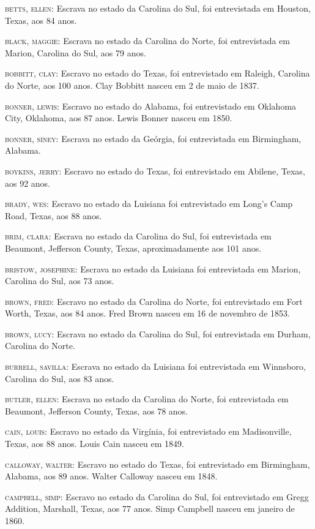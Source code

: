\begin{Parskip}
\textsc{betts, ellen:} Escrava no estado da Carolina do Sul, foi
entrevistada em Houston, Texas, aos 84 anos.

\textsc{black, maggie:} Escrava no estado da Carolina do Norte, foi
entrevistada em Marion, Carolina do Sul, aos 79 anos.

\textsc{bobbitt, clay:} Escravo no estado do Texas, foi entrevistado em
Raleigh, Carolina do Norte, aos 100 anos. Clay Bobbitt nasceu em 2 de
maio de 1837.

\textsc{bonner, lewis:} Escravo no estado do Alabama, foi entrevistado
em Oklahoma City, Oklahoma, aos 87 anos. Lewis Bonner nasceu em 1850.

\textsc{bonner, siney:} Escrava no estado da Geórgia, foi entrevistada
em Birmingham, Alabama.

\textsc{boykins, jerry:} Escravo no estado do Texas, foi entrevistado em
Abilene, Texas, aos 92 anos.

\textsc{brady, wes:} Escravo no estado da Luisiana foi entrevistado em
Long's Camp Road, Texas, aos 88 anos.

\textsc{brim, clara:} Escrava no estado da Carolina do Sul, foi
entrevistada em Beaumont, Jefferson County, Texas, aproximadamente aos
101 anos.

\textsc{bristow, josephine:} Escrava no estado da Luisiana foi
entrevistada em Marion, Carolina do Sul, aos 73 anos.

\textsc{brown, fred:} Escravo no estado da Carolina do Norte, foi
entrevistado em Fort Worth, Texas, aos 84 anos. Fred Brown nasceu em 16
de novembro de 1853.

\textsc{brown, lucy:} Escrava no estado da Carolina do Sul, foi
entrevistada em Durham, Carolina do Norte.

\textsc{burrell, savilla:} Escrava no estado da Luisiana foi
entrevistada em Winnsboro, Carolina do Sul, aos 83 anos.

\textsc{butler, ellen:} Escrava no estado da Carolina do Norte, foi
entrevistada em Beaumont, Jefferson County, Texas, aos 78 anos.

\textsc{cain, louis:} Escravo no estado da Virgínia, foi entrevistado em
Madisonville, Texas, aos 88 anos. Louis Cain nasceu em 1849.

\textsc{calloway, walter:} Escravo no estado do Texas, foi entrevistado
em Birmingham, Alabama, aos 89 anos. Walter Calloway nasceu em 1848.

\textsc{campbell, simp:} Escravo no estado da Carolina do Sul, foi
entrevistado em Gregg Addition, Marshall, Texas, aos 77 anos. Simp
Campbell nasceu em janeiro de 1860.


\end{Parskip}

